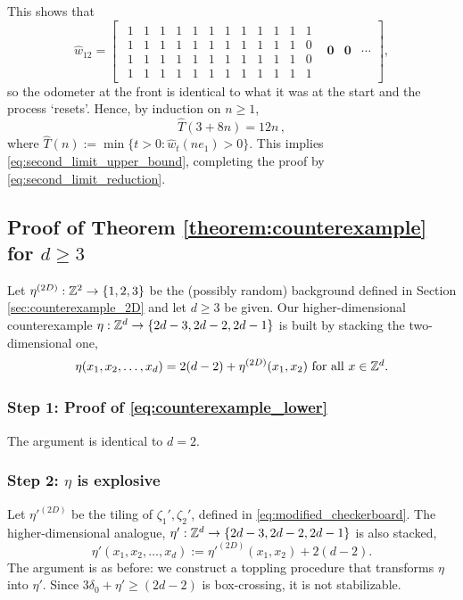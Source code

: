 \documentclass[12pt]{amsart}
\begin{document}
This shows that
\[
\hat{w}_{12} = 
\begin{bmatrix}
\begin{smallmatrix}
1 & 1 & 1 & 1 & 1 & 1 & 1 & 1 & 1 & 1 & 1 & 1 \\ 
1 & 1 & 1 & 1 & 1 & 1 & 1 & 1 & 1 & 1 & 1 & 0 \\ 
1 & 1 & 1 & 1 & 1 & 1 & 1 & 1 & 1 & 1 & 1 & 0 \\ 
1 & 1 & 1 & 1 & 1 & 1 & 1 & 1 & 1 & 1 & 1 & 1
\end{smallmatrix}
& 
\mathbf{0} 
&
\mathbf{0} 
& \cdots
\end{bmatrix},
\]
so the odometer at the front is identical to what it was at the start and the process `resets'. Hence, 
by induction on $n\geq1$,
\begin{equation}
\hat{T}(3 + 8 n) = 12 n\,,
\end{equation}
where $\hat{T}(n) := \min\{ t > 0 : \hat{w}_t(n e_1) > 0 \}$. 
This implies  \eqref{eq:second_limit_upper_bound}, completing the proof by \eqref{eq:second_limit_reduction}.



\subsection{Proof of Theorem \ref{theorem:counterexample} for \texorpdfstring{$d \geq 3$}{d > 2}} \label{sec:proof_of_generalization}
Let $\eta^{(2D)}: \mathbb{Z}^2 \to \{1, 2, 3\}$ be the (possibly random) background defined in Section \ref{sec:counterexample_2D} and let $d \geq 3$ be given. Our higher-dimensional counterexample $\eta: \mathbb{Z}^d \to \{ 2 d - 3, 2 d -2, 2 d - 1\}$
is built by stacking the two-dimensional one, 
\begin{equation} \label{eq:stacked_tiling1}
\eta(x_1, x_2, \ldots, x_d) = 2  (d- 2) + \eta^{(2D)}(x_1, x_2) \mbox{ for all $x \in \mathbb{Z}^d$}.
\end{equation}
\subsubsection*{Step 1: Proof of \eqref{eq:counterexample_lower}}
The argument is identical to $d = 2$. 



\subsubsection*{Step 2: $\eta$ is explosive}

Let ${\eta'}^{(2D)}$ be the tiling of $\zeta_1', \zeta_2'$, defined in \eqref{eq:modified_checkerboard}.
The higher-dimensional analogue, $\eta': \mathbb{Z}^d \to \{ 2 d - 3, 2 d -2, 2 d - 1\}$ is also stacked, 
\begin{equation} \label{eq:stacked_tiling2}
\eta'(x_1, x_2, \ldots, x_d) := {\eta'}^{(2D)}(x_1, x_2) + 2  (d - 2).
\end{equation}
The argument is as before: we construct a toppling procedure that transforms $\eta$ into $\eta'$. Since $3  \delta_0 + \eta' \geq (2 d - 2)$ is box-crossing, it is not stabilizable. 
\end{document}
